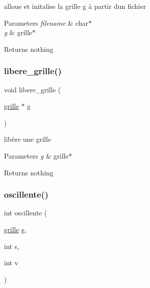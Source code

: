 alloue et initalise la grille g à partir d\textquotesingle{}un fichier


\begin{DoxyParams}{Parameters}
{\em filename} & char$\ast$ \\
\hline
{\em g} & grille$\ast$ \\
\hline
\end{DoxyParams}
\begin{DoxyReturn}{Returns}
nothing 
\end{DoxyReturn}
\mbox{\label{structgrille_a7074b2b15576e9d2b3cd15c3a1dc7012}} 
\subsubsection{\texorpdfstring{libere\+\_\+grille()}{libere\_grille()}}
{\footnotesize\ttfamily void libere\+\_\+grille (\begin{DoxyParamCaption}\item[{\hyperlink{structgrille}{grille} $\ast$}]{g }\end{DoxyParamCaption})\hspace{0.3cm}{\ttfamily [related]}}

libère une grille


\begin{DoxyParams}{Parameters}
{\em g} & grille$\ast$ \\
\hline
\end{DoxyParams}
\begin{DoxyReturn}{Returns}
nothing 
\end{DoxyReturn}
\mbox{\label{structgrille_a0d4f8f37ee19771ae5cbc147b5f2baef}} 
\subsubsection{\texorpdfstring{oscillente()}{oscillente()}}
{\footnotesize\ttfamily int oscillente (\begin{DoxyParamCaption}\item[{\hyperlink{structgrille}{grille}}]{g,  }\item[{int}]{s,  }\item[{int}]{v }\end{DoxyParamCaption})\hspace{0.3cm}{\ttfamily [related]}}

